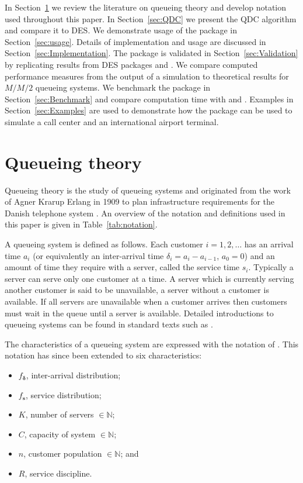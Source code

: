 \documentclass[article]{jss}
\begin{document}
In Section~\ref{sec:queueing} we review the literature on queueing
theory and develop notation used throughout this paper. In
Section~\ref{sec:QDC} we present the QDC algorithm and compare it to
DES. We demonstrate usage of the package in
Section~\ref{sec:usage}. Details of implementation and usage are
discussed in Section~\ref{sec:Implementation}. The package is
validated in Section~\ref{sec:Validation} by replicating results from
DES packages  and . We compare computed
performance measures from the output of a 
simulation to theoretical results for $M/M/2$ queueing systems. We
benchmark the package in Section~\ref{sec:Benchmark} and compare
computation time with  and . Examples in
Section~\ref{sec:Examples} are used to demonstrate how the package can
be used to simulate a call center and an international airport
terminal.

\section{Queueing theory} \label{sec:queueing}

Queueing theory is the study of queueing systems and originated from
the work of Agner Krarup Erlang in 1909 to plan infrastructure
requirements for the Danish telephone system
\citep[p.~2]{thomopoulos2012fundamentals}. An overview of the notation
and definitions used in this paper is given in
Table~\ref{tab:notation}.

A queueing system is defined as follows. Each customer
$i = 1,2,\ldots$ has an arrival time $a_i$ (or equivalently an
inter-arrival time $\delta_i = a_i - a_{i-1}$, $a_0 = 0$) and an
amount of time they require with a server, called the service time
$s_i$. Typically a server can serve only one customer at a time. A
server which is currently serving another customer is said to be
unavailable, a server without a customer is available. If all servers
are unavailable when a customer arrives then customers must wait in
the queue until a server is available. Detailed introductions to
queueing systems can be found in standard texts such as
\citet{bhat2015introduction}.

The characteristics of a queueing system are expressed with the notation of \citet{kendall1953stochastic}. This notation has since been extended to six characteristics:
\begin{itemize}
\item $f_{\mathbf{\delta}}$, inter-arrival distribution;
\item $f_{\mathbf{s}}$, service distribution; 
\item $K$, number of servers $\in \mathbb{N}$;
\item $C$, capacity of system $\in \mathbb{N}$; 
\item $n$, customer population $\in \mathbb{N}$; and
\item $R$, service discipline.
\end{itemize}
\end{document}
